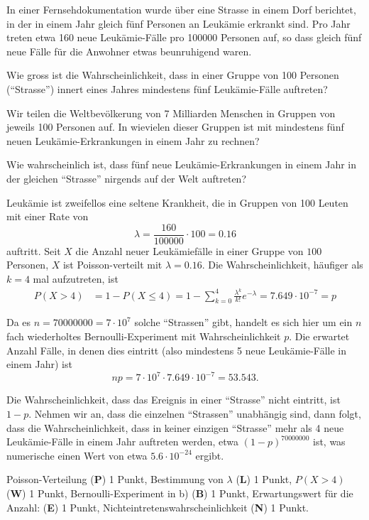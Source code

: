 In einer Fernsehdokumentation wurde über eine Strasse in einem Dorf berichtet,
in der in einem Jahr gleich fünf Personen an Leukämie erkrankt sind.
Pro Jahr treten etwa 160 neue Leukämie-Fälle pro 100000 Personen auf,
so dass gleich fünf neue Fälle für die Anwohner etwas beunruhigend
waren.
\begin{teilaufgaben}
\item
Wie gross ist die Wahrscheinlichkeit, dass in einer Gruppe von
100 Personen (``Strasse'') innert eines Jahres mindestens fünf
Leukämie-Fälle auftreten?
\item
Wir teilen die Weltbevölkerung von 7 Milliarden Menschen
in Gruppen von jeweils 100 Personen auf.
In wievielen dieser Gruppen ist mit mindestens fünf neuen
Leukämie-Erkrankungen in einem Jahr zu rechnen?
\item
Wie wahrscheinlich ist, dass fünf neue Leukämie-Erkrankungen in einem 
Jahr in der gleichen ``Strasse'' nirgends auf der Welt auftreten?
\end{teilaufgaben}


\begin{loesung}
\begin{teilaufgaben}
\item
Leukämie ist zweifellos eine seltene Krankheit, die in Gruppen von 
100 Leuten mit einer Rate von 
\[
\lambda = \frac{160}{100000}\cdot 100=0.16
\]
auftritt.
Seit $X$ die Anzahl neuer Leukämiefälle in einer Gruppe von $100$
Personen, $X$ ist Poisson-verteilt mit $\lambda=0.16$.
Die Wahrscheinlichkeit, häufiger als $k=4$ mal aufzutreten, ist
\begin{align*}
P(X>4)
&=
1-P(X\le 4)
=
1-\sum_{k=0}^4 \frac{\lambda^k}{k!}e^{-\lambda}
=
7.649\cdot10^{-7}=p
\end{align*}
\item
Da es $n=70000000=7\cdot 10^7$ solche ``Strassen'' gibt, handelt es sich hier um
ein $n$ fach wiederholtes Bernoulli-Experiment mit Wahrscheinlichkeit $p$.
Die erwartet Anzahl Fälle, in denen dies eintritt (also mindestens 5
neue Leukämie-Fälle in einem Jahr) ist
\[
np=7\cdot 10^7\cdot 7.649\cdot 10^{-7}=53.543.
\]
\item
Die Wahrscheinlichkeit, dass das Ereignis in einer ``Strasse'' nicht eintritt,
ist $1-p$.
Nehmen wir an, dass die einzelnen ``Strassen'' unabhängig sind, dann
folgt, dass die Wahrscheinlichkeit, dass in keiner einzigen ``Strasse''
mehr als 4 neue Leukämie-Fälle in einem Jahr auftreten werden, 
etwa $(1-p)^{70000000}$ ist, was numerische einen Wert von etwa
$5.6\cdot 10^{-24}$ ergibt.
\qedhere
\end{teilaufgaben}
\end{loesung}

\begin{bewertung}
Poisson-Verteilung ({\bf P}) 1 Punkt,
Bestimmung von $\lambda$ ({\bf L}) 1 Punkt,
$P(X>4)$ ({\bf W}) 1 Punkt,
Bernoulli-Experiment in b) ({\bf B}) 1 Punkt,
Erwartungswert für die Anzahl: ({\bf E}) 1 Punkt,
Nichteintretenswahrscheinlichkeit ({\bf N}) 1 Punkt.
\end{bewertung}



